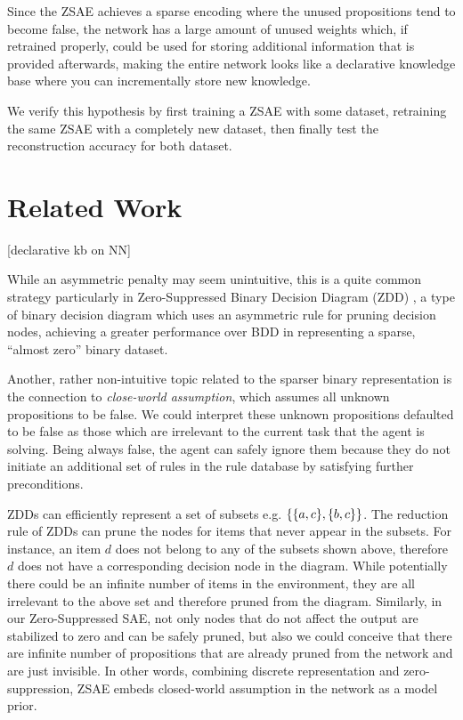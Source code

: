 Since the ZSAE achieves a sparse encoding where the unused propositions
tend to become false, the network has a large amount of unused weights
which, if retrained properly, could be used for storing additional
information that is provided afterwards, making the entire network looks
like a declarative knowledge base where you can incrementally store
new knowledge.

We verify this hypothesis by first training a ZSAE with some dataset, retraining the same ZSAE with
a completely new dataset, then finally test the reconstruction accuracy for both dataset.

\section{Related Work}


[declarative kb on NN]




While an asymmetric penalty may seem unintuitive, this is a quite common
strategy particularly in Zero-Suppressed Binary Decision Diagram (ZDD)
\cite{minato1993zero}, a type of binary decision diagram \cite{bryant1986graph} which
uses an asymmetric rule for pruning decision nodes, achieving a greater
performance over BDD in representing a sparse, ``almost zero'' binary dataset.

Another, rather non-intuitive topic related to the sparser binary representation
is the connection to \emph{close-world assumption}, which assumes all unknown
propositions to be false.
% 
We could interpret these unknown propositions defaulted to be false as those which are irrelevant
to the current task that the agent is solving.
Being always false, the agent can safely ignore them because
they do not initiate an additional set of rules in the rule database by satisfying further preconditions.

ZDDs can efficiently represent a set of subsets e.g. ${\left\{{\left\{a,c\right\}},{\left\{b,c\right\}}\right\}}$.
The reduction rule of ZDDs can prune the nodes for items that never appear in the subsets.
For instance, an item $d$ does not belong to any of the subsets shown above, therefore $d$ does not have
a corresponding decision node in the diagram.
While potentially there could be an infinite number of items in the environment, they are 
all irrelevant to the above set and therefore pruned from the diagram.
% 
Similarly, in our Zero-Suppressed SAE, not only nodes that do not affect the output are stabilized to zero
and can be safely pruned, but also we could conceive that there are infinite number of propositions
that are already pruned from the network and are just invisible.
In other words, combining discrete representation and zero-suppression,
ZSAE embeds closed-world assumption in the network as a model prior.

